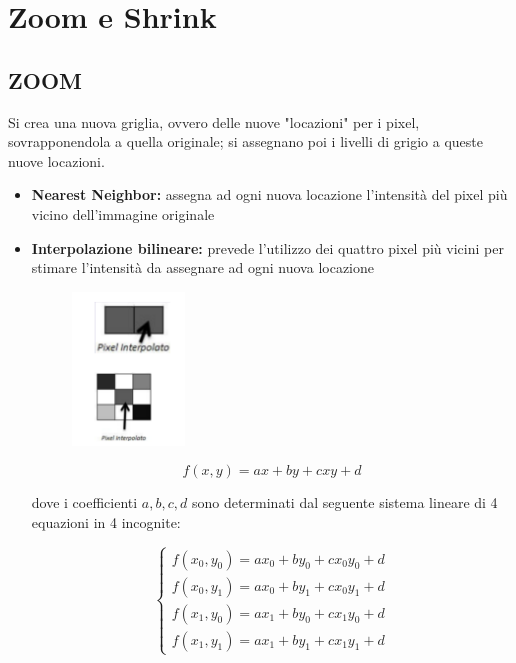\section{Zoom e Shrink}

\subsection{ZOOM}

Si crea una nuova griglia, ovvero delle nuove "locazioni" per i pixel,
sovrapponendola a quella originale; si assegnano poi i livelli di grigio a
queste nuove locazioni.

\begin{itemize}
    \item \textbf{Nearest Neighbor:} assegna ad ogni nuova locazione l'intensità
          del pixel più vicino dell'immagine originale

    \item \textbf{Interpolazione bilineare:} prevede l'utilizzo dei quattro
          pixel più vicini per stimare l'intensità da assegnare ad ogni nuova
          locazione

          \begin{figure}[H]
              \centering
              \includegraphics[width=3cm, keepaspectratio]{capitoli/immagini/imgs/esempio-interpolazione.png}
          \end{figure}

          $$
              f(x,y)=ax+by+cxy+d
          $$

          dove i coefficienti $a, b, c, d$ sono determinati dal seguente sistema
          lineare di 4 equazioni in 4 incognite:

          $$
              \left\{\begin{array}{l}
                  f\left(x_0, y_0\right)=a x_0+b y_0+c x_0 y_0+d \\
                  f\left(x_0, y_1\right)=a x_0+b y_1+c x_0 y_1+d \\
                  f\left(x_1, y_0\right)=a x_1+b y_0+c x_1 y_0+d \\
                  f\left(x_1, y_1\right)=a x_1+b y_1+c x_1 y_1+d
              \end{array}\right.
          $$


\end{itemize}
